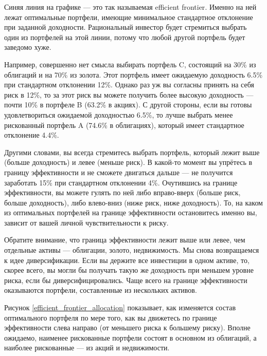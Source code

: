 Синяя линия на графике --- это так называемая 
{efficient frontier}. Именно на ней лежат оптимальные портфели, имеющие 
минимальное стандартное отклонение при заданной доходности. Рациональный 
инвестор будет стремиться выбрать один из портфелей на этой линии, потому что 
любой другой портфель будет заведомо хуже.

Например, совершенно нет смысла выбирать портфель C, состоящий на 30\% из 
облигаций и на 70\% из золота. Этот портфель имеет ожидаемую доходность 6.5\% 
при стандартном отклонении 12\%. Однако раз уж вы согласны принять на себя риск 
в 12\%, то за этот риск вы можете получить более высокую доходность --- почти 
10\% в портфеле B (63.2\% в акциях). С другой стороны, если вы готовы 
удовлетвориться ожидаемой доходностью 6.5\%, то лучше выбрать менее рискованный 
портфель A (74.6\% в облигациях), который имеет стандартное отклонение 4.4\%.

Другими словами, вы всегда стремитесь выбрать портфель, который лежит выше 
(больше доходность) и левее (меньше риск). В какой-то момент вы упрётесь в 
границу эффективности и не сможете двигаться дальше --- не получится заработать 
15\% при стандартном отклонении 4\%. Очутившись на границе эффективности, вы 
можете гулять по ней либо вправо-вверх (больше риск, больше доходность), либо 
влево-вниз (ниже риск, ниже доходность). То, на каком из оптимальных портфелей 
на границе эффективности остановитесь именно вы, зависит от вашей личной 
чувствительности к риску.

Обратите внимание, что граница эффективности лежит выше или левее, чем отдельные 
активы --- облигации, золото, недвижимость. Мы снова возвращаемся к идее 
диверсификации. Если вы держите все инвестиции в одном активе, то, скорее всего, 
вы могли бы получать такую же доходность при меньшем уровне риска, если бы 
диверсифицировались. Чаще всего на границе эффективности оказываются портфели, 
составленные из нескольких активов.

Рисунок \ref{efficient_frontier_allocation} показывает, как изменяется состав 
оптимального портфеля по мере того, как вы движетесь по границе эффективности 
слева направо (от меньшего риска к большему риску). Вполне ожидаемо, наименее 
рискованные портфели состоят в основном из облигаций, а наиболее рискованные --- 
из акций и недвижимости.

